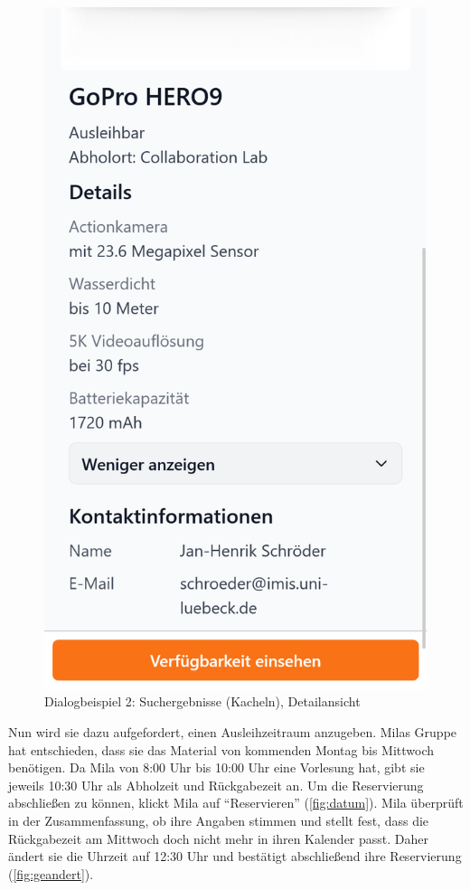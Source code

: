 \begin{figure}[p]
    \includegraphics[scale=0.19]{Bilder/Dialgobeispiel/Details 2.png}
    \caption{Dialogbeispiel 2: Suchergebnisse (Kacheln), Detailansicht}\label{fig:suchen}
\end{figure}

\newpage
Nun wird sie dazu aufgefordert, einen Ausleihzeitraum anzugeben. Milas Gruppe hat entschieden, dass
sie das Material von kommenden Montag bis Mittwoch benötigen. Da Mila von 8:00 Uhr bis 10:00 Uhr eine Vorlesung
hat, gibt sie jeweils 10:30 Uhr als Abholzeit und Rückgabezeit an. Um die Reservierung abschließen zu
können, klickt Mila auf \enquote{Reservieren} (\ref{fig:datum}). Mila überprüft in der
Zusammenfassung, ob ihre Angaben stimmen und stellt fest, dass die Rückgabezeit am Mittwoch doch
nicht mehr in ihren Kalender passt. Daher ändert sie die Uhrzeit auf 12:30 Uhr und bestätigt
abschließend ihre Reservierung (\ref{fig:geandert}).

